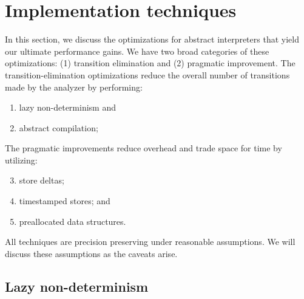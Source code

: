 \documentclass[preprint,onecolumn,9pt]{sigplanconf} %
\begin{document}
\section{Implementation techniques}
\label{sec:opt}

In this section, we discuss the optimizations for abstract interpreters that
yield our ultimate performance gains.
%
We have two broad categories of these optimizations: (1) transition elimination
and (2) pragmatic improvement.
%
The transition-elimination optimizations reduce the overall number of transitions
made by the analyzer by performing:
\begin{enumerate}
 \item lazy non-determinism and
 \item abstract compilation;
\end{enumerate}
The pragmatic improvements reduce overhead and trade space for time
by utilizing:
\begin{enumerate}
  \setcounter{enumi}{2}
 \item store deltas;
 \item timestamped stores; and
 \item preallocated data structures.
\end{enumerate}

All techniques are precision preserving under reasonable
assumptions. We will discuss these assumptions as the caveats arise.

\subsection{Lazy non-determinism}
\end{document}

